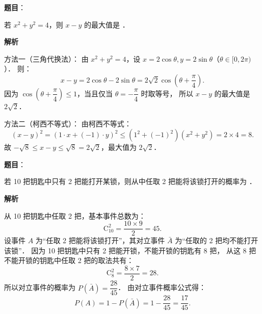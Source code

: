\begin{answer}

\textbf{题目}：

若 $x^2 + y^2 = 4$，则 $x - y$ 的最大值是 \underline{\hspace{2cm}}．

\textbf{解析}

方法一（三角代换法）：
由 $x^2 + y^2 = 4$，设 $x = 2\cos\theta, y = 2\sin\theta$（$\theta \in [0, 2\pi)$）．
则：
\nopagebreak[4]
\[
x - y = 2\cos\theta - 2\sin\theta = 2\sqrt{2}\cos\left(\theta + \frac{\pi}{4}\right).
\]
因为 $\cos\left(\theta + \dfrac{\pi}{4}\right) \leqslant 1$，当且仅当 $\theta = -\dfrac{\pi}{4}$ 时取等号，
所以 $x - y$ 的最大值是 $2\sqrt{2}$．

方法二（柯西不等式）：
由柯西不等式：
\nopagebreak[4]
\[
(x - y)^2 = (1 \cdot x + (-1) \cdot y)^2 \leqslant (1^2 + (-1)^2)(x^2 + y^2) = 2 \times 4 = 8.
\]
故 $-\sqrt{8} \leqslant x - y \leqslant \sqrt{8} = 2\sqrt{2}$，最大值为 $2\sqrt{2}$．


\end{answer}
\begin{answer}

\textbf{题目}：

若 10 把钥匙中只有 2 把能打开某锁，则从中任取 2 把能将该锁打开的概率为 \underline{\hspace{2cm}}．

\textbf{解析}

从 10 把钥匙中任取 2 把，基本事件总数为：
\nopagebreak[4]
\[
\mathrm{C}_{10}^2 = \frac{10 \times 9}{2} = 45.
\]
设事件 $A$ 为“任取 2 把能将该锁打开”，其对立事件 $\bar{A}$ 为“任取的 2 把均不能打开该锁”．
因为 10 把钥匙中只有 2 把能开锁，不能开锁的钥匙有 8 把，
从这 8 把不能开锁的钥匙中任取 2 把的取法共有：
\nopagebreak[4]
\[
\mathrm{C}_8^2 = \frac{8 \times 7}{2} = 28.
\]
所以对立事件的概率为 $P(\bar{A}) = \dfrac{28}{45}$．
由对立事件概率公式得：
\nopagebreak[4]
\[
P(A) = 1 - P(\bar{A}) = 1 - \frac{28}{45} = \frac{17}{45}.
\]


\end{answer}

